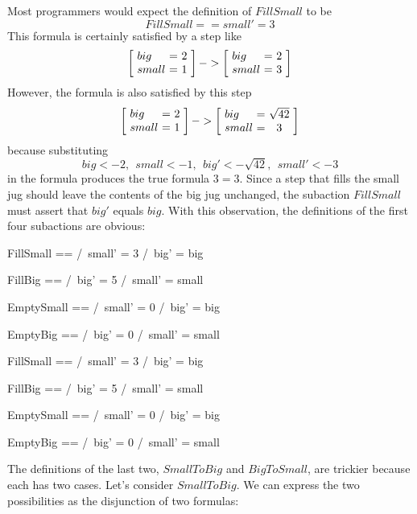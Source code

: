 Most programmers would expect the definition of $FillSmall$ to be
 \[ FillSmall == small' = 3 \]
This formula is certainly satisfied by a step like
 \[ \dhstate{2}{1} -> \dhstate{2}{3}
 \]
However, the formula is also satisfied by this step
  \[ \dhstate{2}{1} -> \dhstate{\sqrt{42}}{3}
 \]
because substituting
 \[ big <- 2, \ \ small <- 1, \ \ big' <- \sqrt{42}, \ \ small' <- 3
 \]
in the formula produces the true formula $3=3$.  Since a step that
fills the small jug should leave the contents of the big jug
unchanged, the subaction $FillSmall$ must assert that $big'$ equals
$big$.  With this observation, the definitions of the first four
subactions are obvious:
 \medskip
\begin{twocols}%
\begin{notla}
FillSmall  == /\ small' = 3 
              /\ big' = big

FillBig    == /\ big' = 5 
              /\ small' = small

EmptySmall == /\ small' = 0 
              /\ big' = big

EmptyBig   == /\ big' = 0 
              /\ small' = small
\end{notla}
\begin{tlatex}
%
%
\@pvspace{8.0pt}%
%
%
\@pvspace{8.0pt}%
%
%
\@pvspace{8.0pt}%
%
%
\end{tlatex}
\midcol
\begin{verbatim*}
FillSmall  == /\ small' = 3 
              /\ big' = big

FillBig    == /\ big' = 5 
              /\ small' = small

EmptySmall == /\ small' = 0 
              /\ big' = big

EmptyBig   == /\ big' = 0 
              /\ small' = small
\end{verbatim*} 
\end{twocols} 
 \medskip
%
The definitions of the last two, $SmallToBig$ and $BigToSmall$, are
trickier because each has two cases.  Let's consider $SmallToBig$.
We can express the two possibilities as the disjunction of two
formulas:
